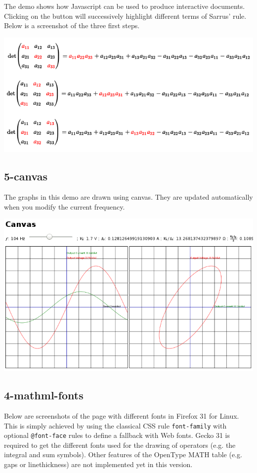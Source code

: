 The demo shows how Javascript can be used to produce interactive documents.
Clicking on the button will successively highlight different terms of Sarrus'
rule. Below is a screenshot of the three first steps.

\includegraphics{screenshots/3-mathml-javascript}

\subsection{5-canvas}

The graphs in this demo are drawn using canvas. They are updated automatically
when you modify the current frequency.

\includegraphics{screenshots/5-canvas}

\subsection{4-mathml-fonts}

Below are screenshots of the page with different fonts in Firefox 31 for Linux.
This is simply achieved by
using the classical CSS rule {\tt font-family} with optional {\tt @font-face}
rules to define a fallback with Web fonts. Gecko 31 is required to get the
different fonts used for the drawing of operators (e.g. the integral and
sum symbols). Other features of the OpenType MATH table (e.g. gaps or
linethickness) are not implemented yet in this version.

